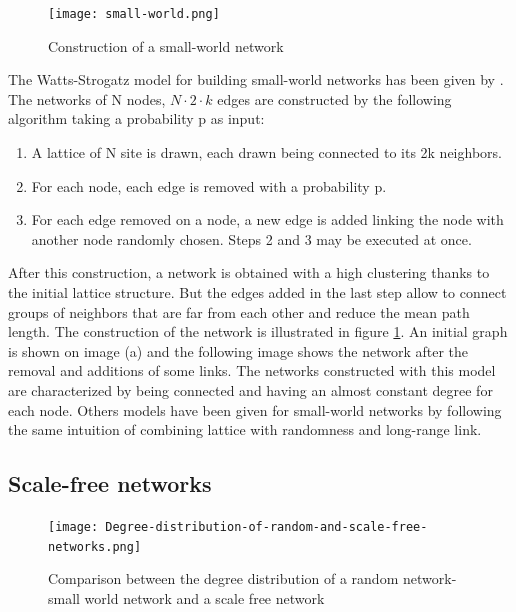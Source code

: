 \documentclass[a4paper, 12pt]{report}
\begin{document}
\begin{figure}
\centering
\texttt{[image: small-world.png]}
\caption{Construction of a small-world network \citep{small-world}}
\label{small-world_pictures}
\end{figure}


The Watts-Strogatz model for building small-world networks has been given by \cite{globalClustering1}. The networks of N nodes, $N \cdot 2 \cdot k$ edges are constructed by the following algorithm taking a probability p as input:
\begin{enumerate}
\item A lattice of N site is drawn, each drawn being connected to its 2k neighbors.
\item For each node, each edge is removed with a probability p.
\item For each edge removed on a node, a new edge is added linking the node with another node randomly chosen. Steps 2 and 3 may be executed at once.
\end{enumerate}
After this construction, a network is obtained with a high clustering thanks to the initial lattice structure. But the edges added in the last step allow to connect groups of neighbors that are far from each other and reduce the mean path length. The construction of the network is illustrated in figure \ref{small-world_pictures}. An initial graph is shown on image (a) and the following image shows the network after the removal and additions of some links. The networks constructed with this model are characterized by being connected and having an almost constant degree for each node. Others models have been given for small-world networks by following the same intuition of combining lattice with randomness and long-range link. \citep{small-world, complex_networks}

\subsection{Scale-free networks}
\label{scale-free-section}
\begin{figure}
\centering
\texttt{[image: Degree-distribution-of-random-and-scale-free-networks.png]}
\caption{Comparison between the degree distribution of a random network- small world network and a scale free network \citep{scale-free_degree}}
\label{scale-free_degree}
\end{figure}
\end{document}
